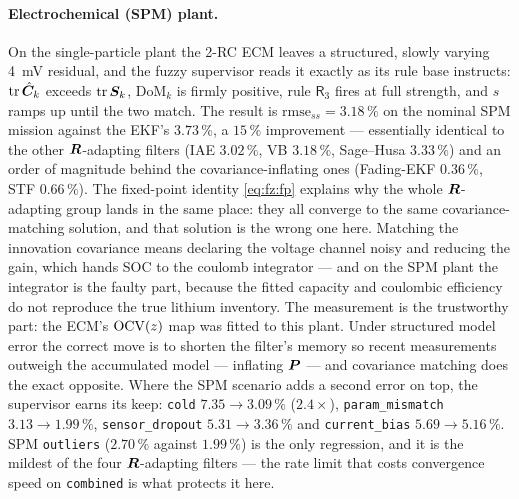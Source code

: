 \paragraph{Electrochemical (SPM) plant.}  On the single-particle plant the 2-RC ECM leaves a
structured, slowly varying \SI{4}{\milli\volt} residual, and the fuzzy supervisor reads it exactly as
its rule base instructs: $\operatorname{tr}\hat{\bm{C}}_k$ exceeds $\operatorname{tr}\bm{S}_k$, $\mathrm{DoM}_k$ is firmly positive,
rule $\mathsf{R}_3$ fires at full strength, and $s$ ramps up until the two match.  The result is
$\mathrm{rmse}_{ss}=3.18\,\%$ on the nominal SPM mission against the EKF's $3.73\,\%$, a $15\,\%$
improvement --- essentially identical to the other $\bm{R}$-adapting filters (IAE $3.02\,\%$, VB
$3.18\,\%$, Sage--Husa $3.33\,\%$) and an order of magnitude behind the covariance-inflating ones
(Fading-EKF $0.36\,\%$, STF $0.66\,\%$).  The fixed-point identity \eqref{eq:fz:fp} explains why the
whole $\bm{R}$-adapting group lands in the same place: they all converge to the same covariance-matching
solution, and that solution is the wrong one here.  Matching the innovation covariance means
declaring the voltage channel noisy and reducing the gain, which hands SOC to the coulomb integrator
--- and on the SPM plant the integrator is the faulty part, because the fitted capacity and coulombic
efficiency do not reproduce the true lithium inventory.  The measurement is the trustworthy part: the
ECM's $\mathrm{OCV}(z)$ map was fitted to this plant.  Under structured model error the correct move is to
shorten the filter's memory so recent measurements outweigh the accumulated model --- inflating $\bm{P}$
--- and covariance matching does the exact opposite.  Where the SPM scenario adds a second error on
top, the supervisor earns its keep: \texttt{cold} $7.35\to3.09\,\%$ ($2.4\times$),
\texttt{param\_mismatch} $3.13\to1.99\,\%$, \texttt{sensor\_dropout} $5.31\to3.36\,\%$ and
\texttt{current\_bias} $5.69\to5.16\,\%$.  SPM \texttt{outliers} ($2.70\,\%$ against $1.99\,\%$) is
the only regression, and it is the mildest of the four $\bm{R}$-adapting filters --- the rate limit that
costs convergence speed on \texttt{combined} is what protects it here.

